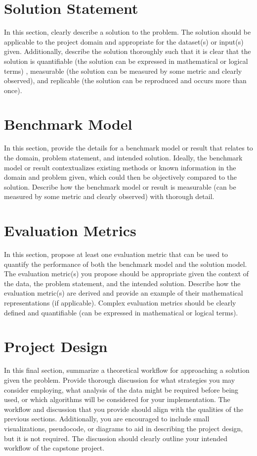\documentclass[11pt, oneside]{article}   	%
\begin{document}
\section{Solution Statement}

In this section, clearly describe a solution to the problem. The solution should be applicable to the project domain and appropriate for the dataset(s) or input(s) given. Additionally, describe the solution thoroughly such that it is clear that the solution is quantifiable (the solution can be expressed in mathematical or logical terms) , measurable (the solution can be measured by some metric and clearly observed), and replicable (the solution can be reproduced and occurs more than once).

\section{Benchmark Model}

In this section, provide the details for a benchmark model or result that relates to the domain, problem statement, and intended solution. Ideally, the benchmark model or result contextualizes existing methods or known information in the domain and problem given, which could then be objectively compared to the solution. Describe how the benchmark model or result is measurable (can be measured by some metric and clearly observed) with thorough detail.

\section{Evaluation Metrics}

In this section, propose at least one evaluation metric that can be used to quantify the performance of both the benchmark model and the solution model. The evaluation metric(s) you propose should be appropriate given the context of the data, the problem statement, and the intended solution. Describe how the evaluation metric(s) are derived and provide an example of their mathematical representations (if applicable). Complex evaluation metrics should be clearly defined and quantifiable (can be expressed in mathematical or logical terms).


\section{Project Design}

In this final section, summarize a theoretical workflow for approaching a solution given the problem. Provide thorough discussion for what strategies you may consider employing, what analysis of the data might be required before being used, or which algorithms will be considered for your implementation. The workflow and discussion that you provide should align with the qualities of the previous sections. Additionally, you are encouraged to include small visualizations, pseudocode, or diagrams to aid in describing the project design, but it is not required. The discussion should clearly outline your intended workflow of the capstone project.
\end{document}
